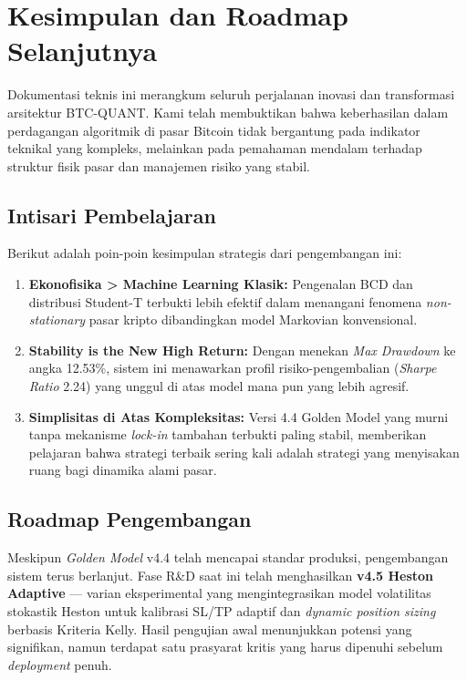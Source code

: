 \section{Kesimpulan dan Roadmap Selanjutnya}
\label{sec:conclusion}

Dokumentasi teknis ini merangkum seluruh perjalanan inovasi dan transformasi arsitektur BTC-QUANT. Kami telah membuktikan bahwa keberhasilan dalam perdagangan algoritmik di pasar Bitcoin tidak bergantung pada indikator teknikal yang kompleks, melainkan pada pemahaman mendalam terhadap struktur fisik pasar dan manajemen risiko yang stabil.

\subsection{Intisari Pembelajaran}
Berikut adalah poin-poin kesimpulan strategis dari pengembangan ini:
\begin{enumerate}
    \item \textbf{Ekonofisika > Machine Learning Klasik:} Pengenalan BCD dan distribusi Student-T terbukti lebih efektif dalam menangani fenomena \textit{non-stationary} pasar kripto dibandingkan model Markovian konvensional.
    \item \textbf{Stability is the New High Return:} Dengan menekan \textit{Max Drawdown} ke angka 12.53\%, sistem ini menawarkan profil risiko-pengembalian (\textit{Sharpe Ratio} 2.24) yang unggul di atas model mana pun yang lebih agresif.
    \item \textbf{Simplisitas di Atas Kompleksitas:} Versi 4.4 Golden Model yang murni tanpa mekanisme \textit{lock-in} tambahan terbukti paling stabil, memberikan pelajaran bahwa strategi terbaik sering kali adalah strategi yang menyisakan ruang bagi dinamika alami pasar.
\end{enumerate}

\subsection{Roadmap Pengembangan}

Meskipun \textit{Golden Model} v4.4 telah mencapai standar produksi, pengembangan sistem terus berlanjut. Fase R\&D saat ini telah menghasilkan \textbf{v4.5 Heston Adaptive} --- varian eksperimental yang mengintegrasikan model volatilitas stokastik Heston untuk kalibrasi SL/TP adaptif dan \textit{dynamic position sizing} berbasis Kriteria Kelly. Hasil pengujian awal menunjukkan potensi yang signifikan, namun terdapat satu prasyarat kritis yang harus dipenuhi sebelum \textit{deployment} penuh.

